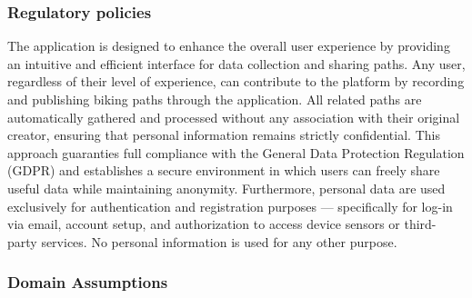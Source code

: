 \subsubsection{Regulatory policies}

The application is designed to enhance the overall user experience by providing an intuitive and efficient interface for data collection and sharing paths. Any user, regardless of their level of experience, can contribute to the platform by recording and publishing biking paths through the application. All related paths are automatically gathered and processed without any association with their original creator, ensuring that personal information remains strictly confidential. This approach guaranties full compliance with the General Data Protection Regulation (GDPR) \cite{gdpr_info_2025} and establishes a secure environment in which users can freely share useful data while maintaining anonymity. Furthermore, personal data are used exclusively for authentication and registration purposes — specifically for log-in via email, account setup, and authorization to access device sensors or third-party services. No personal information is used for any other purpose.

\subsubsection{Domain Assumptions}

